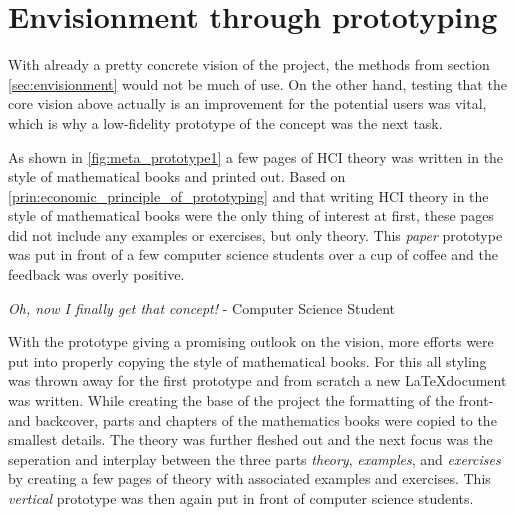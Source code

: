 \section*{\todo Envisionment through prototyping}
With already a pretty concrete vision of the project, the methods from section \ref{sec:envisionment} would not be much of use. On the other hand, testing that the core vision above actually is an improvement for the potential users was vital, which is why a low-fidelity prototype of the concept was the next task.



As shown in \ref{fig:meta_prototype1} a few pages of HCI theory was written in the style of mathematical books and printed out. Based on \ref{prin:economic_principle_of_prototyping} and that writing HCI theory in the style of mathematical books were the only thing of interest at first, these pages did not include any examples or exercises, but only theory. This \emph{paper} prototype was put in front of a few computer science students over a cup of coffee and the feedback was overly positive.

\begin{displayquote}
  \emph{Oh, now I finally get that concept!} - Computer Science Student
\end{displayquote}

With the prototype giving a promising outlook on the vision, more efforts were put into properly copying the style of mathematical books. For this all styling was thrown away for the first prototype and from scratch a new \LaTeX document was written. While creating the base of the project the formatting of the front- and backcover, parts and chapters of the mathematics books were copied to the smallest details. The theory was further fleshed out and the next focus was the seperation and interplay between the three parts \emph{theory}, \emph{examples}, and \emph{exercises} by creating a few pages of theory with associated examples and exercises. This \emph{vertical} prototype was then again put in front of computer science students.



\todo




